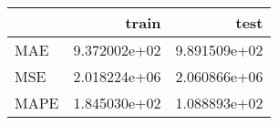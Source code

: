 \begin{tabular}{lrr}
\toprule
{} &         train &          test \\
\midrule
MAE  &  9.372002e+02 &  9.891509e+02 \\
MSE  &  2.018224e+06 &  2.060866e+06 \\
MAPE &  1.845030e+02 &  1.088893e+02 \\
\bottomrule
\end{tabular}
